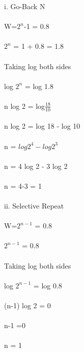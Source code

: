 \documentclass[a4paper,12pt]{article}
\begin{document}
   i. Go-Back N\\\\

   W=$2^{n}$-1 = 0.8\\\\
   $2^{n}$ = 1 + 0.8 = 1.8\\\\
   Taking log both sides \\\\
   log $2^{n}$ = log 1.8\\\\
   n log 2 = log$\frac{18}{10}$\\\\
   n log 2 = log 18 - log 10 \\\\
   n = $log 2^{4} - log 2^{3}$\\\\
   n = 4 log 2 - 3 log 2 \\\\
   n = 4-3 = 1 \\\\

   ii. Selective Repeat \\\\
   W=$2^{n-1}$ = 0.8\\\\
   $2^{n-1}$ = 0.8 \\\\
   Taking log both sides \\\\
   log $2^{n-1}$ = log 0.8\\\\
   (n-1) log 2 = 0\\\\
   n-1 =0\\\\
   n = 1 \\\\
\end{document}
